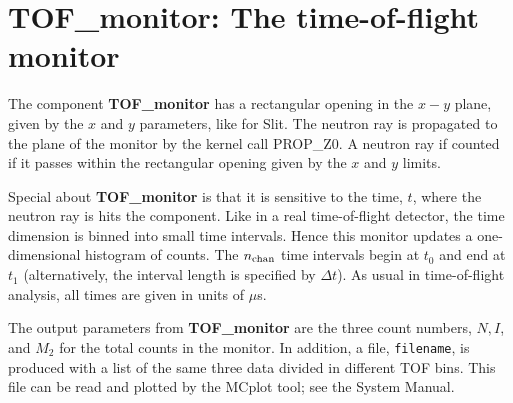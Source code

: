 
\section{TOF\_monitor: The time-of-flight monitor}

The component {\bf TOF\_monitor} has a rectangular opening
in the $x-y$ plane, given by the $x$ and $y$ parameters,
like for {\rm Slit}.
The neutron ray is propagated to the plane of the monitor
by the kernel call PROP\_Z0.
A neutron ray if counted if it passes within the rectangular opening 
given by the $x$ and $y$ limits.

Special about {\bf TOF\_monitor} is that it is sensitive to
the time, $t$, where the neutron ray is hits the component.
Like in a real time-of-flight detector, the time dimension is
binned into small time intervals.
Hence this monitor updates a one-dimensional histogram of counts.
The $n_{\rm chan}$ time intervals begin at $t_0$ and
end at $t_1$ (alternatively, the interval length is specified by $\Delta t$).
As usual in time-of-flight analysis, all times are given in units of $\mu$s.

The output parameters from {\bf TOF\_monitor} are the three count numbers,
$N, I$, and $M_2$ for the total counts in the monitor.
In addition, a file, \verb+filename+, is produced with a list of 
the same three data divided in different TOF bins.
This file can be read and plotted by the {\rm MCplot} tool; see the
System Manual.

